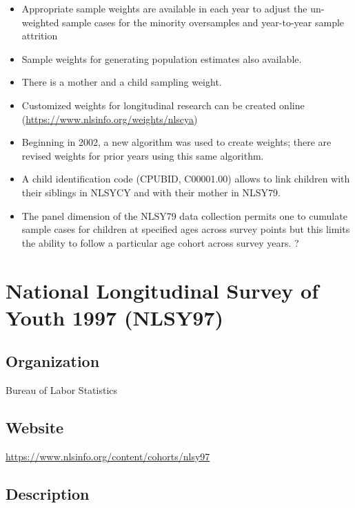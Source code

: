 \documentclass[
]{book}
\providecommand{\tightlist}{%
  \setlength{\itemsep}{0pt}\setlength{\parskip}{0pt}}
\begin{document}
\begin{itemize}
\tightlist
\item
  Appropriate sample weights are available in each year to adjust the un-weighted sample cases for the minority oversamples and year-to-year sample attrition
\item
  Sample weights for generating population estimates also available.
\item
  There is a mother and a child sampling weight.
\item
  Customized weights for longitudinal research can be created online (\url{https://www.nlsinfo.org/weights/nlscya})
\item
  Beginning in 2002, a new algorithm was used to create weights; there are revised weights for prior years using this same algorithm.
\item
  A child identification code (CPUBID, C00001.00) allows to link children with their siblings in NLSYCY and with their mother in NLSY79.
\item
  The panel dimension of the NLSY79 data collection permits one to cumulate sample cases for children at specified ages across survey points but this limits the ability to follow a particular age cohort across survey years. ?
\end{itemize}

\mainmatter

\hypertarget{national-longitudinal-survey-of-youth-1997-nlsy97}{%
\chapter{National Longitudinal Survey of Youth 1997 (NLSY97)}\label{national-longitudinal-survey-of-youth-1997-nlsy97}}

\hypertarget{organization-59}{%
\section{Organization}\label{organization-59}}

Bureau of Labor Statistics

\hypertarget{website-59}{%
\section{Website}\label{website-59}}

\url{https://www.nlsinfo.org/content/cohorts/nlsy97}

\hypertarget{description-59}{%
\section{Description}\label{description-59}}
\end{document}
